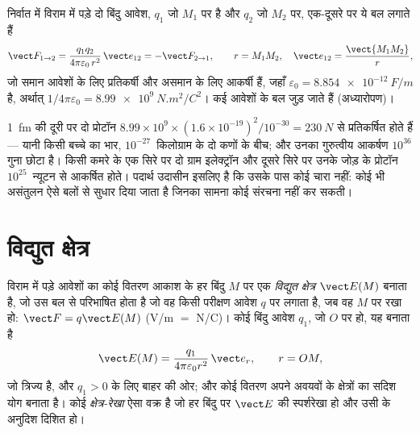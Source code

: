 \begin{theorem}[कूलॉम का नियम]\label{thm:b1:electrostatics-gauss:coulomb}
निर्वात में विराम में पड़े दो बिंदु आवेश, $q_1$ जो $M_1$ पर है और $q_2$ जो
$M_2$ पर, एक-दूसरे पर ये बल लगाते हैं
\[
\vect F_{1 \to 2} = \frac{q_1q_2}{4\pi\varepsilon_0\,r^2}\,\vect e_{12} = -\vect F_{2 \to 1},
\qquad r = M_1M_2,\quad \vect e_{12} = \frac{\vect{M_1M_2}}{r},
\]
जो समान आवेशों के लिए प्रतिकर्षी और असमान के लिए आकर्षी हैं, जहाँ
\emph{} $\varepsilon_0 = \qty{8.854e-12}{F/m}$ है, अर्थात्
$1/4\pi\varepsilon_0 = \qty{8.99e9}{N.m^2/C^2}$। कई आवेशों के बल जुड़ जाते हैं
(अध्यारोपण)।
\end{theorem}
\admitted

\begin{example}[कितना प्रबल]\label{ex:b1:electrostatics-gauss:strong}
\qty{1}{fm} की दूरी पर दो प्रोटॉन $8.99 \times 10^9 \times (1.6 \times
10^{-19})^2/10^{-30} = \qty{230}{N}$ से प्रतिकर्षित होते हैं --- यानी किसी
बच्चे का भार, $10^{-27}$~किलोग्राम के दो कणों के बीच; और उनका गुरुत्वीय
आकर्षण $10^{36}$ गुना छोटा है। किसी कमरे के एक सिरे पर दो ग्राम
इलेक्ट्रॉन और दूसरे सिरे पर उनके जोड़ के प्रोटॉन $10^{25}$~न्यूटन से
आकर्षित होते। पदार्थ उदासीन इसलिए है कि उसके पास कोई चारा नहीं: कोई भी
असंतुलन ऐसे बलों से सुधार दिया जाता है जिनका सामना कोई संरचना नहीं कर
सकती।
\end{example}

\section{विद्युत क्षेत्र}

\begin{definition}[स्थिरवैद्युत क्षेत्र]\label{def:b1:electrostatics-gauss:field}
विराम में पड़े आवेशों का कोई वितरण आकाश के हर बिंदु $M$ पर एक
\emph{विद्युत क्षेत्र} $\vect E(M)$ बनाता है, जो उस बल से परिभाषित होता है
जो वह किसी परीक्षण आवेश $q$ पर लगाता है, जब वह $M$ पर रखा हो: $\vect F = q\vect E(M)$ (\unit{V/m} $=$
\unit{N/C})। कोई बिंदु आवेश $q_1$, जो $O$ पर हो, यह बनाता है
\[
\vect E(M) = \frac{q_1}{4\pi\varepsilon_0 r^2}\,\vect e_r , \qquad r = OM ,
\]
जो त्रिज्य है, और $q_1 > 0$ के लिए बाहर की ओर; और कोई वितरण अपने अवयवों के
क्षेत्रों का सदिश योग बनाता है। कोई \emph{क्षेत्र-रेखा} ऐसा वक्र है जो हर
बिंदु पर $\vect E$ की स्पर्शरेखा हो और उसी के अनुदिश दिशित हो।
\end{definition}

